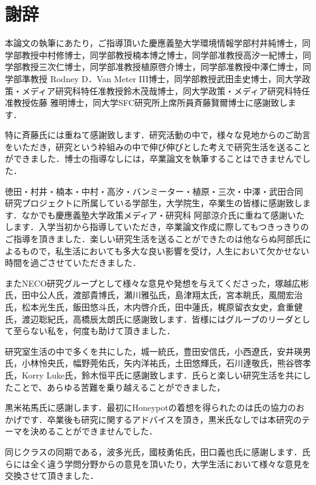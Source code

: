 \chapter*{謝辞}
\label{thanks}


本論文の執筆にあたり，ご指導頂いた慶應義塾大学環境情報学部村井純博士，同学部教授中村修博士，同学部教授楠本博之博士，同学部准教授高汐一紀博士，同学部教授三次仁博士，同学部准教授植原啓介博士，同学部准教授中澤仁博士，同学部準教授 Rodney D．Van Meter III博士，同学部教授武田圭史博士，同大学政策・メディア研究科特任准教授鈴木茂哉博士，同大学政策・メディア研究科特任准教授佐藤 雅明博士，同大学SFC研究所上席所員斉藤賢爾博士に感謝致します．


特に斉藤氏には重ねて感謝致します．研究活動の中で，様々な見地からのご助言をいただき，研究という枠組みの中で伸び伸びとした考えで研究生活を送ることができました．博士の指導なしには，卒業論文を執筆することはできませんでした．


徳田・村井・楠本・中村・高汐・バンミーター・植原・三次・中澤・武田合同研究プロジェクトに所属している学部生，大学院生，卒業生の皆様に感謝致します．なかでも慶應義塾大学政策メディア・研究科 阿部涼介氏に重ねて感謝いたします．入学当初から指導していただき，卒業論文作成に際してもつきっきりのご指導を頂きました．楽しい研究生活を送ることができたのは他ならぬ阿部氏によるもので，私生活においても多大な良い影響を受け，人生において欠かせない時間を過ごさせていただきました．

またNECO研究グループとして様々な意見や発想を与えてくださった，塚越広彬氏，田中公人氏，渡部貴博氏，瀬川雅弘氏，島津翔太氏，宮本眺氏，風間宏治氏，松本光生氏，飯田悠斗氏，木内啓介氏，田中蓮氏，梶原留衣女史，倉重健氏，渡辺聡紀氏，高橋辰太朗氏に感謝致します．皆様にはグループのリーダとして至らない私を，何度も助けて頂きました．

研究室生活の中で多くを共にした，城一統氏，豊田安信氏，小西遼氏，安井瑛男氏，小林怜央氏，幅野莞佑氏，矢内洋祐氏，土田悠輝氏，石川達敬氏，熊谷啓孝氏，Korry Luke氏，鈴木恒平氏に感謝致します．氏らと楽しい研究生活を共にしたことで、あらゆる苦難を乗り越えることができました，

黒米祐馬氏に感謝します．最初にHoneypotの着想を得られたのは氏の協力のおかげです．卒業後も研究に関するアドバイスを頂き，黒米氏なしでは本研究のテーマを決めることができませんでした．

同じクラスの同期である，波多光氏，國枝勇佑氏，田口義也氏に感謝します．氏らには全く違う学問分野からの意見を頂いたり，大学生活において様々な意見を交換させて頂きました．

